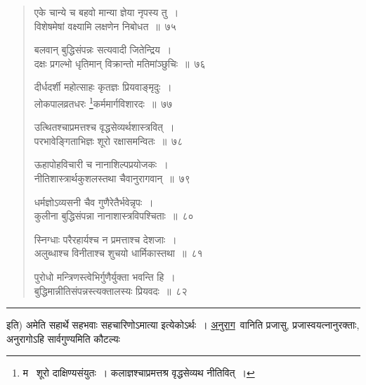 \documentclass[11pt, openany]{book}
\begin{document}
\begin{quote}
{\na एके चान्ये च बहवो मान्या ज्ञेया नृपस्य तु~।\\
विशेषमेषां वक्ष्यामि लक्षणेन निबोधत~॥~७५

बलवान् बुद्धिसंपन्नः सत्यवादी जितेन्द्रिय~।\\
दक्षः प्रगल्भो धृतिमान् विक्रान्तो मतिमांञ्छुचिः~॥~७६

दीर्धदर्शी महोत्साहः कृतज्ञः प्रियवाङ्मृदुः~।\\
लोकपालव्रतधरः \renewcommand{\thefootnote}{1}\footnote{म \textendash\  शूरो दाक्षिण्यसंयुतः~। कलाज्ञश्चाप्रमत्तश्र वृद्धसेव्यथ नीतिवित्~।}कर्ममार्गविशारदः~॥~७७

उत्थितश्चाप्रमत्तश्च वृद्धसेव्यर्थशास्त्रवित्~।\\
परभावेङ्गिताभिज्ञः शूरो रक्षासमन्वितः~॥~७८

ऊहापोहविचारी च नानाशिल्पप्रयोजकः~।\\
नीतिशास्त्रार्थकुशलस्तथा चैवानुरागवान्~॥~७९

धर्मज्ञोऽव्यसनी चैव गुणैरेतैर्भवेन्नृपः~।\\
कुलीना बुद्धिसंपन्ना नानाशास्त्रविपश्चिताः~॥~८०

स्निग्धाः परैरहार्यश्च न प्रमत्ताश्च देशजाः~।\\
अलुब्धाश्च विनीताश्च शुचयो धार्मिकास्तथा~॥~८१

पुरोधो मन्त्रिणस्त्वेभिर्गुणैर्युक्ता भवन्ति हि~।\\
बुद्धिमान्नीतिसंपन्नस्त्यक्तालस्यः प्रियवदः~॥~८२}
\end{quote}

\hrule

\vspace{2mm}
\noindent
इति) अमेति सहार्थे सहभवाः सहचारिणोऽमात्या इत्येकोऽर्थः~। \underline{अनुराग}\textendash\ वानिति प्रजासु, प्रजास्वयत्नानुरक्ताः, अनुरागोऽहि सार्वगुण्यमिति कौटल्यः

\newpage
\end{document}
